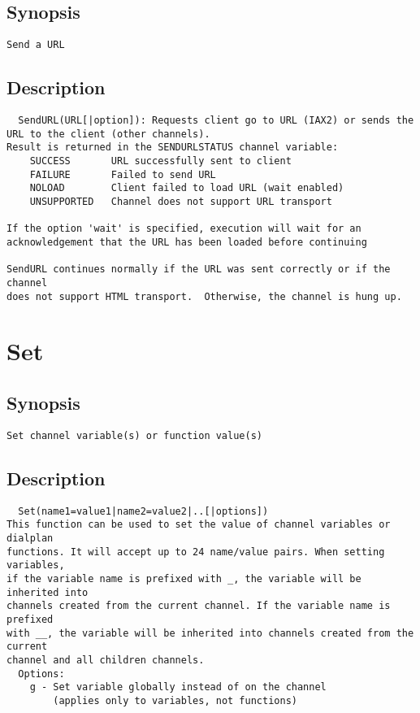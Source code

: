 \subsection{Synopsis}
\begin{verbatim}
Send a URL
\end{verbatim}
\subsection{Description}
\begin{verbatim}
  SendURL(URL[|option]): Requests client go to URL (IAX2) or sends the 
URL to the client (other channels).
Result is returned in the SENDURLSTATUS channel variable:
    SUCCESS       URL successfully sent to client
    FAILURE       Failed to send URL
    NOLOAD        Client failed to load URL (wait enabled)
    UNSUPPORTED   Channel does not support URL transport

If the option 'wait' is specified, execution will wait for an
acknowledgement that the URL has been loaded before continuing

SendURL continues normally if the URL was sent correctly or if the channel
does not support HTML transport.  Otherwise, the channel is hung up.

\end{verbatim}


\section{Set}
\subsection{Synopsis}
\begin{verbatim}
Set channel variable(s) or function value(s)
\end{verbatim}
\subsection{Description}
\begin{verbatim}
  Set(name1=value1|name2=value2|..[|options])
This function can be used to set the value of channel variables or dialplan
functions. It will accept up to 24 name/value pairs. When setting variables,
if the variable name is prefixed with _, the variable will be inherited into
channels created from the current channel. If the variable name is prefixed
with __, the variable will be inherited into channels created from the current
channel and all children channels.
  Options:
    g - Set variable globally instead of on the channel
        (applies only to variables, not functions)

\end{verbatim}


